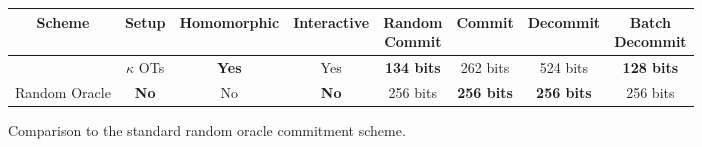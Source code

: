 \begin{figure}
	\small
	\begin{tabular}{|c||c|c|c|c|c|c|c|}
		\hline
		Scheme                 & Setup & Homomorphic & Interactive &\shortstack{Random \\Commit} &  Commit & Decommit & \shortstack{Batch \\Decommit} \\ \hline
		\cite{DBLP:conf/tcc/FrederiksenJNT16} &  $\kappa$ OTs  &     \textbf{Yes}     &     Yes     &   \textbf{134 bits}    &   262 bits    & 524 bits &    \textbf{128 bits}    \\ \hline
		Random Oracle             &      \textbf{ No}       &     No      &     \textbf{No}      &   256 bits    &   \textbf{256 bits}    & \textbf{256 bits} &    256 bits    \\\hline
	\end{tabular}
	\caption{Comparison to the standard random oracle commitment scheme.}
\end{figure}